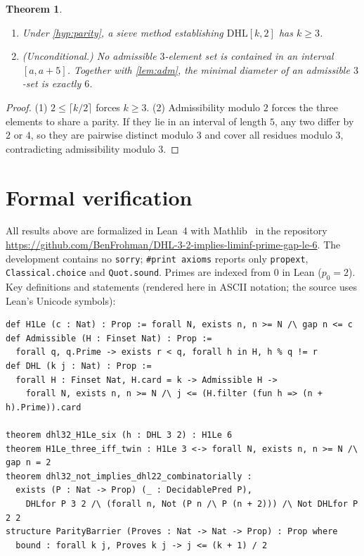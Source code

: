 \documentclass[11pt]{amsart}
\theoremstyle{plain}
\newtheorem{theorem}{Theorem}[section]
\theoremstyle{definition}
\theoremstyle{remark}
\newcommand{\DHL}{\mathrm{DHL}}
\begin{document}
\begin{theorem}\label{thm:parity}
\leavevmode
\begin{enumerate}
\item Under \cref{hyp:parity}, a sieve method establishing $\DHL[k,2]$ has $k\ge3$.
\item (Unconditional.) No admissible $3$-element set is contained in an interval $[a,a+5]$. Together with \cref{lem:adm}, the minimal diameter of an admissible $3$-set is exactly $6$.
\end{enumerate}
\end{theorem}
\begin{proof}
(1) $2\le\lceil k/2\rceil$ forces $k\ge3$. (2) Admissibility modulo $2$ forces the three elements to share a parity. If they lie in an interval of length $5$, any two differ by $2$ or $4$, so they are pairwise distinct modulo $3$ and cover all residues modulo $3$, contradicting admissibility modulo $3$.
\end{proof}

\section{Formal verification}\label{sec:lean}

All results above are formalized in Lean~4 with Mathlib~\cite{Mathlib} in the repository \url{https://github.com/BenFrohman/DHL-3-2-implies-liminf-prime-gap-le-6}. The development contains no \texttt{sorry}; \texttt{\#print axioms} reports only \texttt{propext}, \texttt{Classical.choice} and \texttt{Quot.sound}. Primes are indexed from $0$ in Lean ($p_0=2$). Key definitions and statements (rendered here in ASCII notation; the source uses Lean's Unicode symbols):

\begin{lstlisting}
def H1Le (c : Nat) : Prop := forall N, exists n, n >= N /\ gap n <= c
def Admissible (H : Finset Nat) : Prop :=
  forall q, q.Prime -> exists r < q, forall h in H, h % q != r
def DHL (k j : Nat) : Prop :=
  forall H : Finset Nat, H.card = k -> Admissible H ->
    forall N, exists n, n >= N /\ j <= (H.filter (fun h => (n + h).Prime)).card

theorem dhl32_H1Le_six (h : DHL 3 2) : H1Le 6
theorem H1Le_three_iff_twin : H1Le 3 <-> forall N, exists n, n >= N /\ gap n = 2
theorem dhl32_not_implies_dhl22_combinatorially :
  exists (P : Nat -> Prop) (_ : DecidablePred P),
    DHLfor P 3 2 /\ (forall n, Not (P n /\ P (n + 2))) /\ Not DHLfor P 2 2
structure ParityBarrier (Proves : Nat -> Nat -> Prop) : Prop where
  bound : forall k j, Proves k j -> j <= (k + 1) / 2
\end{lstlisting}
\end{document}
